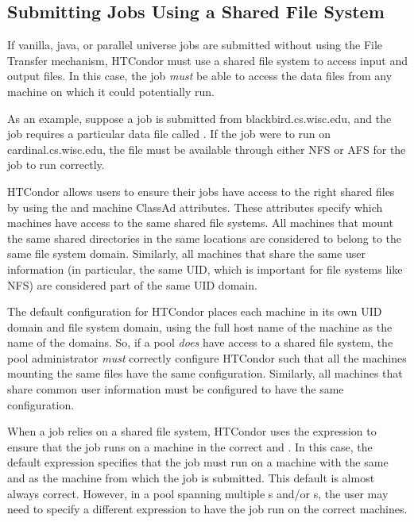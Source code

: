 
\subsection{\label{sec:shared-fs}
Submitting Jobs Using a Shared File System} 

If vanilla, java, or parallel universe
jobs are submitted without using the File Transfer mechanism, 
HTCondor must use a shared file system to access input and output
files. 
In this case, the job \emph{must} be able to access the data files
from any machine on which it could potentially run.

As an example, suppose a job is submitted from blackbird.cs.wisc.edu,
and the job requires a particular data file called
.  If the job were to run on
cardinal.cs.wisc.edu, the file  must be
available through either NFS or AFS for the job to run correctly.

HTCondor allows users to ensure their jobs have access to the right
shared files by using the  and
 machine ClassAd attributes.
These attributes specify which machines have access to the same shared
file systems.
All machines that mount the same shared directories in the same
locations are considered to belong to the same file system domain.
Similarly, all machines that share the same user information (in
particular, the same UID, which is important for file systems like
NFS) are considered part of the same UID domain.

The default configuration for HTCondor places each machine
in its own UID domain and file system domain, using the full host name of the
machine as the name of the domains.
So, if a pool \emph{does} have access to a shared file system,
the pool administrator \emph{must} correctly configure HTCondor 
such that all
the machines mounting the same files have the same
 configuration.
Similarly, all machines that share common user information must be
configured to have the same  configuration.

When a job relies on a shared file system,
HTCondor uses the
 expression to ensure that the job runs
on a machine in the
correct  and .
In this case, the default  expression specifies
that the job must run on a machine with the same 
and  as the machine from which the job
is submitted.
This default is almost always correct.
However, in a pool spanning multiple s and/or
s, the user may need to specify a different
 expression to have the job run on the correct
machines.

